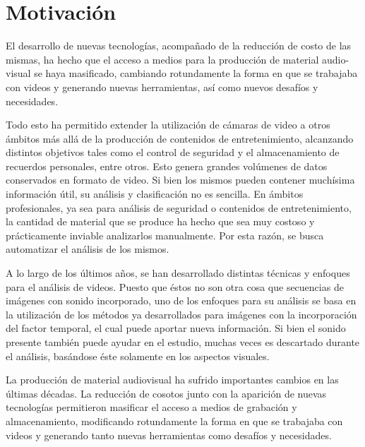 \section{Motivación}
\iffalse
Explique el problema o situación de referencia en el que se desarrolla la
propuesta o los interrogantes en el campo disciplinario a los que la propuesta se
dirige. Desarrolle la importancia e impacto de los objetivos y el conocimiento
que se generará. En esta sección no es necesario describir las tareas específicas
que se realizarán (para eso, ver Objetivos específicos).
\fi

El desarrollo de nuevas tecnologías, acompañado de la reducción de costo de las mismas, ha hecho que el acceso a medios para la 
producción de material audio-visual se haya masificado, cambiando rotundamente la forma en que se trabajaba con videos y generando nuevas
herramientas, así como nuevos desafíos y necesidades.

Todo esto ha permitido extender la utilización de cámaras de video a otros ámbitos más allá de la producción de contenidos de entretenimiento,
alcanzando distintos objetivos tales como el control de seguridad y el almacenamiento de recuerdos personales, entre otros.
Esto genera grandes volúmenes de datos conservados en formato de video. 
Si bien los mismos pueden contener muchísima información útil, su análisis y clasificación no es sencilla. En ámbitos profesionales,
ya sea para análisis de seguridad o contenidos de entretenimiento, la cantidad de material que se produce ha hecho que sea muy costoso y prácticamente
inviable analizarlos manualmente. Por esta razón, se busca automatizar el análisis de los mismos.

A lo largo de los últimos años, se han desarrollado distintas técnicas y enfoques para el análisis de videos.
Puesto que éstos no son otra cosa que secuencias de imágenes con sonido incorporado, uno de los enfoques para su análisis
se basa en la utilización de los métodos ya desarrollados para imágenes con la incorporación del factor temporal, el cual puede
aportar nueva información. Si bien el sonido presente también puede ayudar en el estudio, muchas veces es descartado durante el análisis,
basándose éste solamente en los aspectos visuales.

La producción de material audiovisual ha sufrido importantes cambios en las últimas décadas. La reducción de cosotos junto con la aparición de nuevas
tecnologías permitieron masificar el acceso a medios de grabación y almacenamiento, modificando rotundamente la forma en que se trabajaba con videos y
generando tanto nuevas herramientas como desafíos y necesidades.

